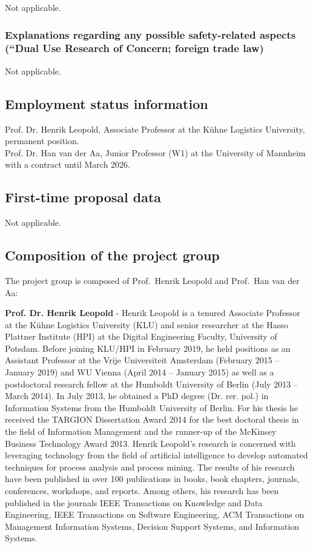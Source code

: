 Not applicable.

\subsubsection{Explanations regarding any possible safety-related aspects (“Dual Use Research of Concern; foreign trade law)}

Not applicable.

\subsection{Employment status information}

Prof. Dr. Henrik Leopold, Associate Professor at the Kühne Logistics University, permanent position.\\[1em]
Prof. Dr. Han van der Aa, Junior Professor (W1) at the University of Mannheim with a contract until March 2026.

\subsection{First-time proposal data}

Not applicable.

\subsection{Composition of the project group}

The project group is composed of Prof.\ Henrik Leopold and Prof.\ Han van der Aa:


\textbf{Prof. Dr. Henrik Leopold} - Henrik Leopold is a tenured Associate Professor at the K\"uhne Logistics University (KLU) and senior researcher at the Hasso Plattner Institute (HPI) at the Digital Engineering Faculty, University of Potsdam. Before joining KLU/HPI in February 2019, he held positions as an Assistant Professor at the Vrije Universiteit Amsterdam (February 2015 – January 2019) and WU Vienna (April 2014 – January 2015) as well as a postdoctoral research fellow at the Humboldt University of Berlin (July 2013 – March 2014). In July 2013, he obtained a PhD degree (Dr. rer. pol.) in Information Systems from the Humboldt University of Berlin. For his thesis he received the TARGION Dissertation Award 2014 for the best doctoral thesis in the field of Information Management and the runner-up of the McKinsey Business Technology Award 2013. Henrik Leopold's research is concerned with leveraging technology from the field of artificial intelligence to develop automated techniques for process analysis and process mining. The results of his research have been published in over 100 publications in books, book chapters, journals, conferences, workshops, and reports. Among others, his research has been published in the journals IEEE Transactions on Knowledge and Data Engineering, IEEE Transactions on Software Engineering, ACM Transactions on Management Information Systems, Decision Support Systems, and Information Systems. 


